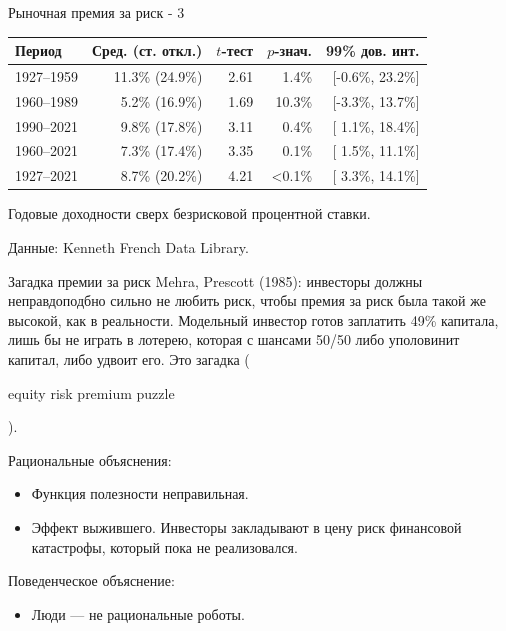 \documentclass{beamer}
\newcommand{\qrcodeminipage}[1]{
	\begin{minipage}{0.3\textwidth}
		\qrcode[height=\textwidth]{#1}
	\end{minipage}
}
\newcommand{\en}[1]{\begin{otherlanguage}{english}#1\end{otherlanguage}}
\begin{document}
\begin{frame}{Рыночная премия за риск - 3}
\centering
\begin{tabular}{l|r|r|r|r}
Период & Сред. (ст. откл.) & $t$-тест & $p$-знач. & 99\% дов. инт. \\
\hline
1927--1959 & 11.3\% (24.9\%) & 2.61 &  1.4\% & [-0.6\%, 23.2\%] \\
1960--1989 &  5.2\% (16.9\%) & 1.69 & 10.3\% & [-3.3\%, 13.7\%] \\
1990--2021 &  9.8\% (17.8\%) & 3.11 &  0.4\% & [ 1.1\%, 18.4\%] \\
1960--2021 &  7.3\% (17.4\%) & 3.35 &  0.1\% & [ 1.5\%, 11.1\%] \\ \hline
1927--2021 &  8.7\% (20.2\%) & 4.21 & <0.1\% & [ 3.3\%, 14.1\%] 
\end{tabular}
{\scriptsize Годовые доходности сверх безрисковой процентной ставки.

Данные: Kenneth French Data Library.}

\end{frame}



\begin{frame}{Загадка премии за риск}
\justify
Mehra, Prescott (1985): инвесторы должны неправдоподбно сильно не любить риск,
чтобы премия за риск была такой же высокой, как в реальности. Модельный 
инвестор готов заплатить 49\% капитала, лишь бы не играть в лотерею, которая с 
шансами 50/50 либо уполовинит капитал, либо удвоит его. Это загадка (\en{equity 
risk premium puzzle}).

\justify
Рациональные объяснения:
\begin{itemize}
\justifying
\item Функция полезности неправильная.
\item Эффект выжившего. Инвесторы закладывают в цену риск финансовой
катастрофы, который пока не реализовался.
\end{itemize}

\justify
Поведенческое объяснение:
\begin{itemize}
\item Люди --- не рациональные роботы.
\end{itemize}
\end{frame}



%
\end{document}
